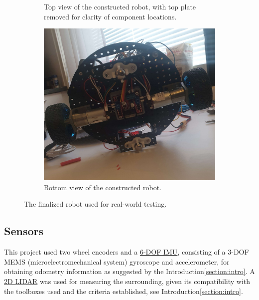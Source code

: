 \begin{figure}
\begin{subfigure}[t]{0.32\columnwidth}
		\caption{Top view of the constructed robot, with top plate removed for clarity of component locations.}
        \label{fig:constructed_robot_top}
	\end{subfigure}
    \hfill
	\begin{subfigure}[t]{0.32\columnwidth}
		\centering
		\includegraphics[width=\textwidth]{images/real_robot_bot.jpg}
		\caption{Bottom view of the constructed robot.}
        \label{fig:constructed_robot_bot}
	\end{subfigure}
    \caption{The finalized robot used for real-world testing.}
    \label{fig:constructed_robot}
\end{figure}


\subsection{Sensors}

This project used two wheel encoders and a \href{https://www.mouser.se/ProductDetail/426-SEN0142}{6-DOF IMU}, consisting of a 3-DOF MEMS (microelectromechanical system) gyroscope and accelerometer\:\cite{invensense_mpu-6000_2013}, for obtaining odometry information as suggested by the Introduction\:\ref{section:intro}. A \href{https://www.mouser.se/ProductDetail/426-DFR0315}{2D LIDAR} was used for measuring the surrounding, given its compatibility with the toolboxes used and the criteria established, see Introduction\:\ref{section:intro}.

